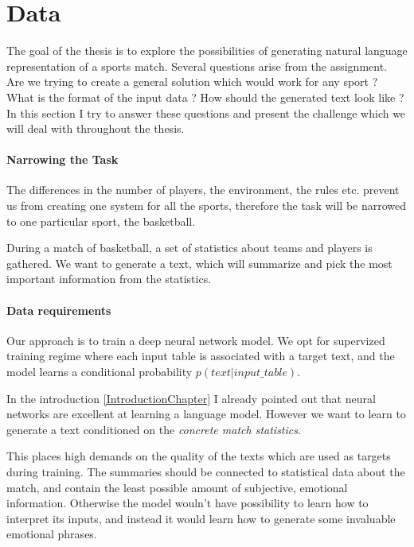 \chapter{Data}

The goal of the thesis is to explore the possibilities of generating natural language representation of a sports match. Several questions arise from the assignment. Are we trying to create a general solution which would work for any sport ? What is the format of the input data ? How should the generated text look like ? In this section I try to answer these questions and present the challenge which we will deal with throughout the thesis.

\subsubsection{Narrowing the Task}
The differences in the number of players, the environment, the rules etc. prevent us from creating one system for all the sports, therefore the task will be narrowed to one particular sport, the basketball.

During a match of basketball, a set of statistics about teams and players is gathered. We want to generate a text, which will summarize and pick the most important information from the statistics.

\subsubsection{Data requirements} \label{data_requirements_section}

Our approach is to train a deep neural network model. We opt for supervized training regime where each input table is associated with a target text, and the model learns a conditional probability $p(text | input\_table)$. 

In the introduction \ref{IntroductionChapter} I already pointed out that neural networks are excellent at learning a language model. However we want to learn to generate a text conditioned on the \emph{concrete match statistics}.

This places high demands on the quality of the texts which are used as targets during training. The summaries should be connected to statistical data about the match, and contain the least possible amount of subjective, emotional information. Otherwise the model wouln't have possibility to learn how to interpret its inputs, and instead it would learn how to generate some invaluable emotional phrases.

